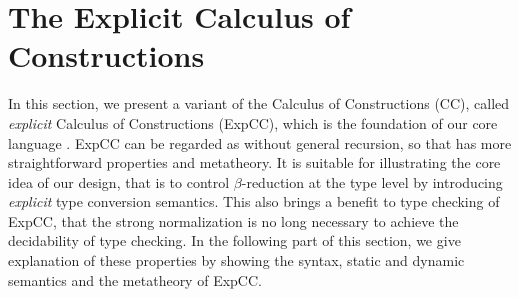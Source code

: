 
\section{The Explicit Calculus of Constructions}




\newcommand{\expcc}{\textsf{ExpCC}\xspace}
\newcommand{\cc}{\textsf{CC}\xspace}
\newcommand{\gram}[1]{\ottgrammartabular{#1\ottafterlastrule}}
\newcommand{\ruleref}[1]{\ottdrulename{#1}}

In this section, we present a variant of the Calculus of Constructions (\cc), called \emph{explicit} Calculus of Constructions (\expcc), which is the foundation of our core language \name. \expcc can be regarded as \name without general recursion, so that has more straightforward properties and metatheory. It is suitable for illustrating the core idea of our design, that is to control $\beta$-reduction at the type level by introducing \emph{explicit} type conversion semantics. This also brings a benefit to type checking of \expcc, that the strong normalization is no long necessary to achieve the decidability of type checking. In the following part of this section, we give explanation of these properties by showing the syntax, static and dynamic semantics and the metatheory of \expcc.

